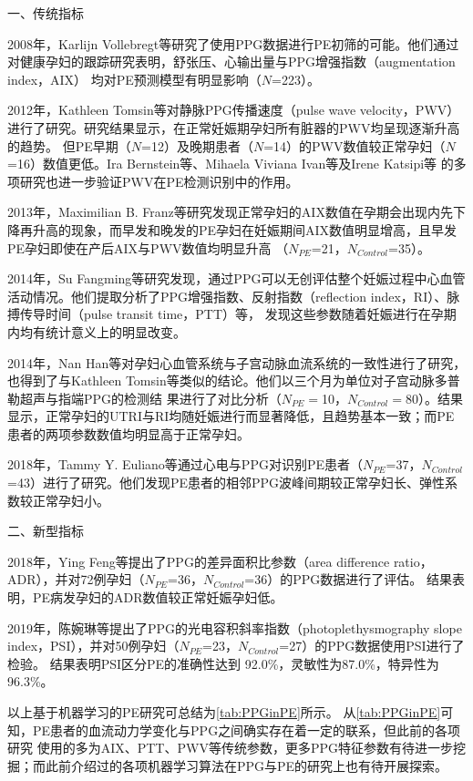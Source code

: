 一、传统指标

2008年，Karlijn Vollebregt等\cite{KARLIJN2008}研究了使用PPG数据进行PE初筛的可能。他们通过对健康孕妇的跟踪研究表明，舒张压、心输出量与PPG增强指数（augmentation index，AIX）
均对PE预测模型有明显影响（$N$=223）。

2012年，Kathleen Tomsin等\cite{Tomsin2012}对静脉PPG传播速度（pulse wave velocity，PWV）进行了研究。研究结果显示，在正常妊娠期孕妇所有脏器的PWV均呈现逐渐升高的趋势。
但PE早期（$N$=12）及晚期患者（$N$=14）的PWV数值较正常孕妇（$N$=16）数值更低。Ira Bernstein等\cite{Ira2014}、Mihaela Viviana Ivan等\cite{VivianaIvan2018}及Irene Katsipi等\cite{Katsipi2014}
的多项研究也进一步验证PWV在PE检测识别中的作用。

2013年，Maximilian B. Franz等\cite{Franz2013}研究发现正常孕妇的AIX数值在孕期会出现内先下降再升高的现象，而早发和晚发的PE孕妇在妊娠期间AIX数值明显增高，且早发PE孕妇即使在产后AIX与PWV数值均明显升高
（$N_{PE}$=21，$N_{Control}$=35）。

2014年，Su Fangming等\cite{Su2014}研究发现，通过PPG可以无创评估整个妊娠过程中心血管活动情况。他们提取分析了PPG增强指数、反射指数（reflection index，RI）、脉搏传导时间（pulse transit time，PTT）等，
发现这些参数随着妊娠进行在孕期内均有统计意义上的明显改变。

2014年，Nan Han等\cite{Han2014}对孕妇心血管系统与子宫动脉血流系统的一致性进行了研究，也得到了与Kathleen Tomsin等\cite{Tomsin2012}类似的结论。他们以三个月为单位对子宫动脉多普勒超声与指端PPG的检测结
果进行了对比分析（$N_{PE}=$10，$N_{Control}=$80）。结果显示，正常孕妇的UTRI与RI均随妊娠进行而显著降低，且趋势基本一致；而PE患者的两项参数数值均明显高于正常孕妇。

2018年，Tammy Y. Euliano等\cite{Euliano2018}通过心电与PPG对识别PE患者（$N_{PE}$=37，$N_{Control}$=43）进行了研究。他们发现PE患者的相邻PPG波峰间期较正常孕妇长、弹性系数较正常孕妇小。

二、新型指标

2018年，Ying Feng等\cite{Feng2018}提出了PPG的差异面积比参数（area difference ratio，ADR），并对72例孕妇（$N_{PE}$=36，$N_{Control}$=36）的PPG数据进行了评估。
结果表明，PE病发孕妇的ADR数值较正常妊娠孕妇低。

2019年，陈婉琳等\cite{Chen2019}提出了PPG的光电容积斜率指数（photoplethysmography slope index，PSI），并对50例孕妇（$N_{PE}$=23，$N_{Control}$=27）的PPG数据使用PSI进行了检验。
结果表明PSI区分PE的准确性达到 92.0\%，灵敏性为87.0\%，特异性为96.3\%。

以上基于机器学习的PE研究可总结为\autoref{tab:PPGinPE}所示。
从\autoref{tab:PPGinPE}可知，PE患者的血流动力学变化与PPG之间确实存在着一定的联系，但此前的各项研究
使用的多为AIX、PTT、PWV等传统参数，更多PPG特征参数有待进一步挖掘；而此前介绍过的各项机器学习算法在PPG与PE的研究上也有待开展探索。

